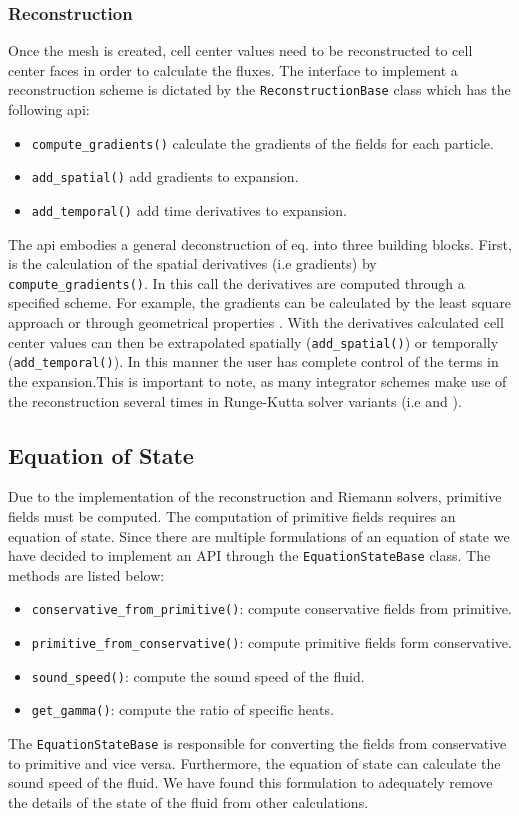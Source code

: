 \subsubsection{Reconstruction}
Once the mesh is created, cell center values need to be reconstructed to cell center faces
in order to calculate the fluxes. The interface to implement a reconstruction
scheme is dictated by the \lstinline{ReconstructionBase} class which has the following api:
\begin{itemize}
	\item \lstinline{compute_gradients()} calculate the gradients of the fields for each particle.
    \item \lstinline{add_spatial()} add gradients to expansion.
    \item \lstinline{add_temporal()} add time derivatives to expansion.
\end{itemize}
The api embodies a general deconstruction of eq. into three building blocks. First, is the
calculation of the spatial derivatives (i.e gradients) by \lstinline{compute_gradients()}.
In this call the derivatives are computed through a specified scheme. For example, the gradients can be 
calculated by the least square approach \citep{Pakmor2016} or through geometrical properties 
\citep{Springel2010}. With the derivatives calculated cell center values can then be extrapolated spatially
(\lstinline{add_spatial()}) or temporally (\lstinline{add_temporal()}). In this manner the
user has complete control of the terms in the expansion.This is important to note, as many integrator 
schemes make use of the reconstruction several times in Runge-Kutta solver variants (i.e \cite{Pakmor2016} 
and \cite{Duffell2011}).

\subsection{Equation of State}
Due to the implementation of the reconstruction and Riemann solvers, primitive fields
must be computed. The computation of primitive fields requires an equation of state. 
Since there are multiple formulations of an equation of state we have 
decided to implement an API through the \lstinline{EquationStateBase} class. The methods
are listed below:
\begin{itemize}
    \item \lstinline{conservative_from_primitive()}: compute conservative fields from primitive.
    \item \lstinline{primitive_from_conservative()}: compute primitive fields form conservative.
    \item \lstinline{sound_speed()}: compute the sound speed of the fluid.
    \item \lstinline{get_gamma()}: compute the ratio of specific heats.
\end{itemize}
The \lstinline{EquationStateBase} is responsible for converting the fields from conservative
to primitive and vice versa. Furthermore, the equation of state can calculate the sound
speed of the fluid. We have found this formulation to adequately remove the details of the
state of the fluid from other calculations.

